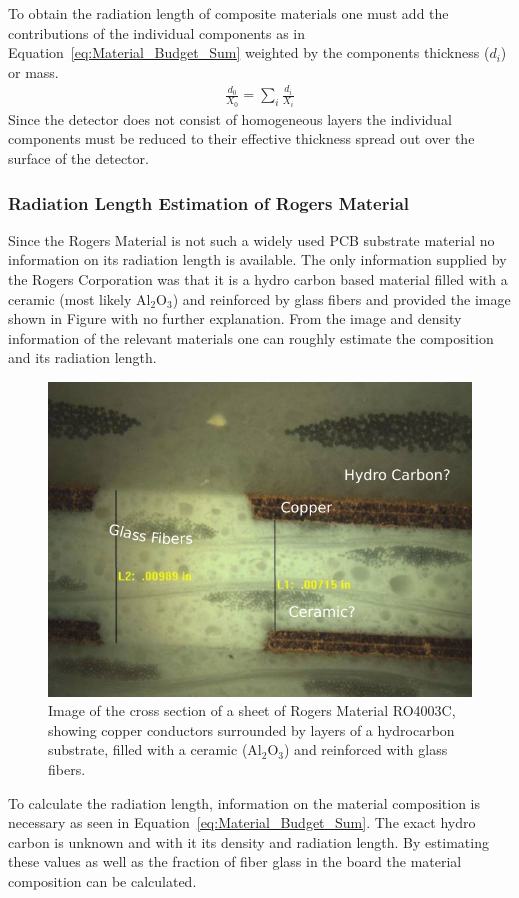\documentclass[../BTOF_summary.tex]{subfiles}
\begin{document}
To obtain the radiation length of composite materials one must add the contributions of the individual components as in Equation~\eqref{eq:Material_Budget_Sum} weighted by the components thickness ($d_i$) or mass.%
\begin{align}\label{eq:Material_Budget_Sum}
	\frac{d_0}{X_0} = \sum_i \frac{d_i}{X_i}
\end{align}
Since the detector does not consist of homogeneous layers the individual components must be reduced to their effective thickness spread out over the surface of the detector.

\subsubsection*{Radiation Length Estimation of Rogers Material}

Since the Rogers Material is not such a widely used PCB substrate material no information on its radiation length is available.
The only information supplied by the Rogers Corporation was that it is a hydro carbon based material filled with a ceramic (most likely Al$_2$O$_3$) and reinforced by glass fibers and provided the image shown in Figure with no further explanation. 
From the image and density information of the relevant materials one can roughly estimate the composition and its radiation length. 

\begin{figure}[htbp]
	\centering
	\includegraphics[width=.6\textwidth]{fig/RogersCrossSection.pdf}
	\caption[Image of the cross section of a sheet of Rogers Material RO4003C.]{Image of the cross section of a sheet of Rogers Material RO4003C, showing copper conductors surrounded by layers of a hydrocarbon substrate, filled with a ceramic (Al$_2$O$_3$) and reinforced with glass fibers.}
	\label{fig:RogersCrossSection}
\end{figure}

To calculate the radiation length, information on the material composition is necessary as seen in Equation~\eqref{eq:Material_Budget_Sum}. The exact hydro carbon is unknown and with it its density and radiation length. By estimating these values as well as the fraction of fiber glass in the board the material composition can be calculated.
\end{document}
